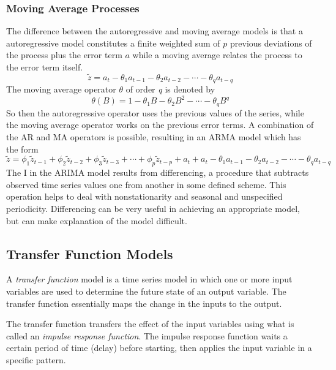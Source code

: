 \documentclass[12pt]{report}
\begin{document}
\subsubsection{Moving Average Processes}
The difference between the autoregressive and moving average
models is that a autoregressive model constitutes a finite
weighted sum of $p$ previous deviations of the process plus the
error term $a$ while a moving average relates the process to the
error term itself.
\begin{equation}
\tilde{z}=a_{t}-\theta_{1}a_{t-1}-\theta_{2}a_{t-2}-\cdots-\theta_{q}a_{t-q}
\end{equation}
The moving average operator $\theta$ of order \textit{q} is
denoted by
\begin{equation}
\theta(B)=1-\theta_{1}B-\theta_{2}B^2-\cdots-\theta_{q}B^q
\end{equation}
So then the autoregressive operator uses the previous values of
the series, while the moving average operator works on the
previous error terms. A combination of the AR and MA operators is
possible, resulting in an ARMA model which has the form
\begin{equation}
\tilde{z}=\phi_{1}\tilde{z}_{t-1}+\phi_{2}\tilde{z}_{t-2}+\phi_{3}\tilde{z}_{t-3}+\cdots+\phi_{p}\tilde{z}_{t-p}+
a_{t}+a_{t}-\theta_{1}a_{t-1}-\theta_{2}a_{t-2}-\cdots-\theta_{q}a_{t-q}
\end{equation}
The I in the ARIMA model results from differencing, a procedure
that subtracts observed time series values one from another in
some defined scheme.  This operation helps to deal with
nonstationarity and seasonal and unspecified periodicity.
Differencing can be very useful in achieving an appropriate model,
but can make explanation of the model difficult.

\subsection{Transfer Function Models} A \textit{transfer
function} model is a time series model in which one or more input
variables are used to determine the future state of an output
variable.  The transfer function essentially maps the change in
the inputs to the output.

The transfer function transfers the effect of the input variables
using what is called an \textit{impulse response function}.  The
impulse response function waits a certain period of time (delay)
before starting, then applies the input variable in a specific
pattern.
\end{document}
